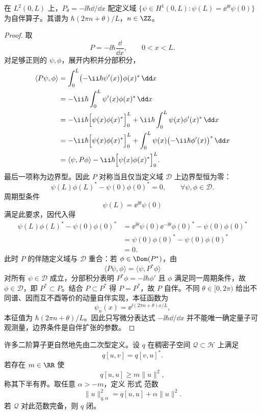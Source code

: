 \begin{proposition}[区间动量算子的自伴边界条件]
在 $L^2(0,L)$ 上，$P_\theta=-\ii\hbar\dd/\dd x$ 配定义域 $\{\psi\in H^1(0,L):\psi(L)=\ee^{\ii\theta}\psi(0)\}$ 为自伴算子。其谱为 $\hbar(2\pi n+\theta)/L$，$n\in\ZZ$。
\end{proposition}
\begin{proof}
取
\[
P=-\ii\hbar\frac{\dd}{\dd x},
\qquad 0<x<L.
\]
对足够正则的 $\psi,\phi$，展开内积并分部积分，
\begin{align*}
\langle P\psi,\phi\rangle
&=\int_0^L\bigl(-\ii\hbar\psi'(x)\bigr)\phi(x)^*\,\dd x\\
&=-\ii\hbar\int_0^L\psi'(x)\phi(x)^*\,\dd x\\
&=-\ii\hbar\Bigl[\psi(x)\phi(x)^*\Bigr]_0^L
+\ii\hbar\int_0^L\psi(x)\phi'(x)^*\,\dd x\\
&=-\ii\hbar\Bigl[\psi(x)\phi(x)^*\Bigr]_0^L
+\int_0^L\psi(x)\bigl(-\ii\hbar\phi'(x)\bigr)^*\,\dd x\\
&=\langle\psi,P\phi\rangle
-\ii\hbar\Bigl[\psi(x)\phi(x)^*\Bigr]_{0}^{L}.
\end{align*}
最后一项称为边界型。因此 $P$ 对称当且仅当定义域 $\mathcal D$ 上边界型恒为零：
\[
\psi(L)\phi(L)^*-\psi(0)\phi(0)^*=0,
\qquad\forall\psi,\phi\in\mathcal D.
\]
周期型条件
\[
\psi(L)=\ee^{\ii\theta}\psi(0)
\]
满足此要求，因代入得
\begin{align*}
\psi(L)\phi(L)^*-\psi(0)\phi(0)^*
&=\ee^{\ii\theta}\psi(0)\ee^{-\ii\theta}\phi(0)^*-\psi(0)\phi(0)^*\\
&=\psi(0)\phi(0)^*-\psi(0)\phi(0)^*\\
&=0.
\end{align*}
此时 $P$ 的伴随定义域与 $\mathcal D$ 重合：若 $\phi\in\Dom(P^*)$，由
\[
\langle P\psi,\phi\rangle=\langle\psi,P^*\phi\rangle
\]
对所有 $\psi\in\mathcal D$ 成立，分部积分表明 $P^*\phi=-\ii\hbar\phi'$ 且 $\phi$ 满足同一周期条件，故 $\phi\in\mathcal D$，即 $P^*\subset P$。结合 $P\subset P^*$ 得 $P=P^*$，故 $P$ 自伴。不同 $\theta\in[0,2\pi)$ 给出不同谱、因而互不酉等价的动量自伴实现，本征函数为
\[
\psi_n(x)=\ee^{\ii(2\pi n+\theta)x/L},
\]
本征值为 $\hbar(2\pi n+\theta)/L$。因此只写微分表达式 $-\ii\hbar\dd/\dd x$ 并不能唯一确定量子可观测量，边界条件是自伴扩张的参数。
\end{proof}


\begin{definition}[闭的下半有界形式]
许多二阶算子更自然地先由二次型定义。设 $q$ 在稠密子空间 $\mathcal Q\subset\mathcal H$ 上满足
\[
q[u,v]=q[v,u]^*.
\]
若存在 $m\in\RR$ 使
\[
q[u,u]\ge m\|u\|^2,
\]
称其下半有界。取任意 $\alpha>-m$，定义 形式 范数
\[
\|u\|_{q,\alpha}^2
=q[u,u]+\alpha\|u\|^2.
\]
若 $\mathcal Q$ 对此范数完备，则 $q$ 闭。
\end{definition}

